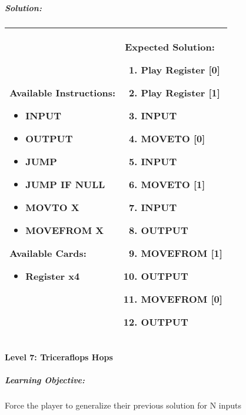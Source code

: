 \subparagraph{Solution:} 
\begin{center}
    \begin{tabular}{ | m{5cm} | m{9cm} | } 
        \hline
            \textbf{Available Instructions:} 
            \begin{itemize}
                \setlength\itemsep{-.35em}
                \item INPUT
                \item OUTPUT
                \item JUMP
                \item JUMP IF NULL
                \item MOVTO X
                \item MOVEFROM X
            \end{itemize}
            \textbf{Available Cards:} 
            \begin{itemize}
                \setlength\itemsep{-.35em}
                \item Register x4
            \end{itemize}& 
            \textbf{Expected Solution:} 
            \begin{enumerate}
                \setlength\itemsep{-.35em}
                \item Play Register [0]
                \item Play Register [1]
                \item INPUT
                \item MOVETO [0]
                \item INPUT
                \item MOVETO [1]
                \item INPUT
                \item OUTPUT
                \item MOVEFROM [1] 
                \item OUTPUT
                \item MOVEFROM [0] 
                \item OUTPUT
            \end{enumerate}
            \\
        \hline
    \end{tabular}
\end{center}

\paragraph{Level 7: Triceraflops Hops}
\subparagraph{Learning Objective:} Force the player to generalize their previous solution for N inputs

